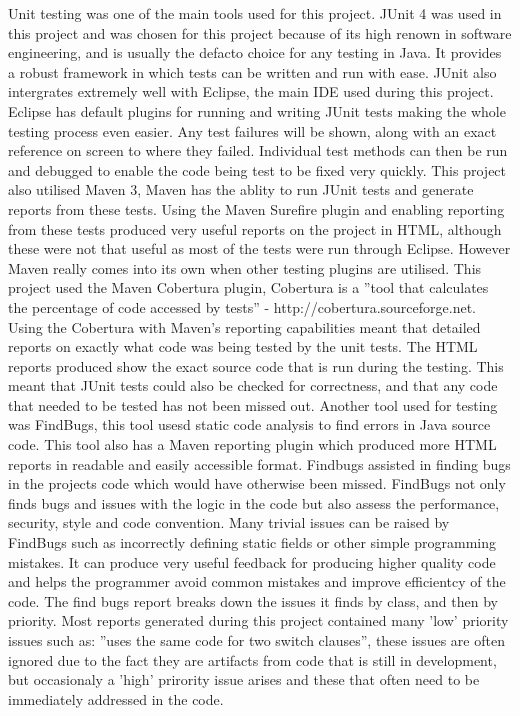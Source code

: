 \documentclass[10pt,twocolumn]{article}
\begin{document}
Unit testing was one of the main tools used for this project. JUnit 4 was used in this project and was chosen for this project because
of its high renown in software engineering, and is usually the defacto choice for any testing in Java. It provides a robust framework
in which tests can be written and run with ease. JUnit also intergrates extremely well with Eclipse, the main IDE used during this project. Eclipse has default plugins for running and writing JUnit tests making the whole testing process even easier. Any test
failures will be shown, along with an exact reference on screen to where they failed. Individual test methods can then be run and
debugged to enable the code being test to be fixed very quickly.
This project also utilised Maven 3, Maven has the ablity to run JUnit tests and generate reports from these tests. Using the Maven
Surefire plugin and enabling reporting from these tests produced very useful reports on the project in HTML, although these were not
that useful as most of the tests were run through Eclipse. However Maven really comes into its own when other testing plugins are
utilised. This project used the Maven Cobertura plugin, Cobertura is a ''tool that calculates the percentage of code accessed by 
tests'' - http://cobertura.sourceforge.net. Using the Cobertura with Maven's reporting capabilities meant that detailed reports
on exactly what code was being tested by the unit tests. The HTML reports produced show the exact source code that is run during the
testing. This meant that JUnit tests could also be checked for correctness, and that any code that needed to be tested has not been
missed out.
Another tool used for testing was FindBugs, this tool usesd static code analysis to find errors in Java source code. This tool also
has a Maven reporting plugin which produced more HTML reports in readable and easily accessible format. Findbugs assisted in finding bugs in the projects code which would have otherwise been missed. FindBugs not only finds bugs and issues with the logic in the code
but also assess the performance, security, style and code convention. Many trivial issues can be raised by FindBugs such as 
incorrectly defining static fields or other simple programming mistakes. It can produce very useful feedback for producing
higher quality code and helps the programmer avoid common mistakes and improve efficientcy of the code. The find bugs report breaks
down the issues it finds by class, and then by priority. Most reports generated during this project contained many 'low' priority
issues such as: ''uses the same code for two switch clauses'', these issues are often ignored due to the fact they are artifacts
from code that is still in development, but occasionaly a 'high' prirority issue arises and these that often need to be immediately
addressed in the code. 
\end{document}
